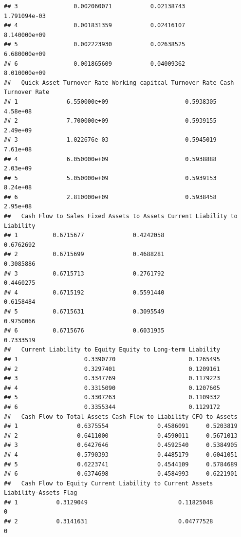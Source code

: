 \documentclass[
]{book}
\begin{document}
\begin{verbatim}
## 3                0.002060071           0.02138743                1.791094e-03
## 4                0.001831359           0.02416107                8.140000e+09
## 5                0.002223930           0.02638525                6.680000e+09
## 6                0.001865609           0.04009362                8.010000e+09
##   Quick Asset Turnover Rate Working capitcal Turnover Rate Cash Turnover Rate
## 1              6.550000e+09                      0.5938305           4.58e+08
## 2              7.700000e+09                      0.5939155           2.49e+09
## 3              1.022676e-03                      0.5945019           7.61e+08
## 4              6.050000e+09                      0.5938888           2.03e+09
## 5              5.050000e+09                      0.5939153           8.24e+08
## 6              2.810000e+09                      0.5938458           2.95e+08
##   Cash Flow to Sales Fixed Assets to Assets Current Liability to Liability
## 1          0.6715677              0.4242058                      0.6762692
## 2          0.6715699              0.4688281                      0.3085886
## 3          0.6715713              0.2761792                      0.4460275
## 4          0.6715192              0.5591440                      0.6158484
## 5          0.6715631              0.3095549                      0.9750066
## 6          0.6715676              0.6031935                      0.7333519
##   Current Liability to Equity Equity to Long-term Liability
## 1                   0.3390770                     0.1265495
## 2                   0.3297401                     0.1209161
## 3                   0.3347769                     0.1179223
## 4                   0.3315090                     0.1207605
## 5                   0.3307263                     0.1109332
## 6                   0.3355344                     0.1129172
##   Cash Flow to Total Assets Cash Flow to Liability CFO to Assets
## 1                 0.6375554              0.4586091     0.5203819
## 2                 0.6411000              0.4590011     0.5671013
## 3                 0.6427646              0.4592540     0.5384905
## 4                 0.5790393              0.4485179     0.6041051
## 5                 0.6223741              0.4544109     0.5784689
## 6                 0.6374698              0.4584993     0.6221901
##   Cash Flow to Equity Current Liability to Current Assets Liability-Assets Flag
## 1           0.3129049                          0.11825048                     0
## 2           0.3141631                          0.04777528                     0

\end{verbatim}
\end{document}
